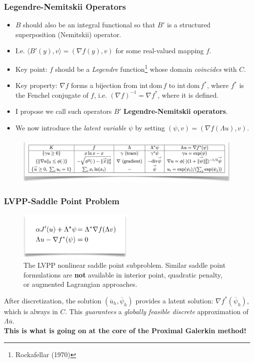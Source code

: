 \documentclass[aspectratio=169,xcolor=dvipsnames,11pt]{beamer}
\begin{document}
\begin{frame}\frametitle{Legendre-Nemitskii Operators}
\begin{itemize}
\item $B$ should also be an integral functional so that $B'$ is a structured superposition (Nemitskii) operator.
\item  I.e. $\langle B'(y), v \rangle = (\nabla f(y), v)$ for some real-valued mapping $f$. \pause
\item Key point: $f$ should be a \textit{Legendre} function\footnote{\tiny Rockafellar (1970)} whose domain \textit{coincides} with $C$. \pause
\item Key property: $\nabla f$ forms a bijection from $\mathrm{int\, dom\,} f$ to $\mathrm{int\, dom\,} f^*$, where $f^*$ is the Fenchel conjugate of $f$, i.e. $(\nabla f)^{-1} = \nabla f^*$, where it is defined.\pause
\item I propose we call such operators $B'$ \textbf{Legendre-Nemitskii operators}.\pause 
\item We now introduce the \textit{latent variable} $\psi$ by setting $(\psi,v) =  (\nabla f(\Lambda u), v)$.  
\end{itemize}
\begin{figure}[h]
\includegraphics[width=0.85\linewidth]{Figures/lvpp-transform-table.png} 
\end{figure}
\end{frame}

\begin{frame}\frametitle{LVPP-Saddle Point Problem}
\begin{figure}[h]
\includegraphics[width=0.5\textwidth, keepaspectratio]{Figures/lvpp-spp.png}
\caption{The LVPP nonlinear saddle point subproblem. Similar saddle point formulations are \textbf{not} available in interior point, quadratic penalty, or augmented Lagrangian approaches.}
\end{figure}
\begin{center}
 After discretization, the solution $(\overline{u}_h,\overline{\psi}_{h})$ provides a latent solution: $\nabla f^*(\overline{\psi}_h)$, which is always in $C$. This \textit{guarantees} a \textit{globally feasible discrete} approximation of $\Lambda \overline{u}$. \\ \textbf{This is what is going on at the core of the Proximal Galerkin method!}
\end{center}
\end{frame}
\end{document}
